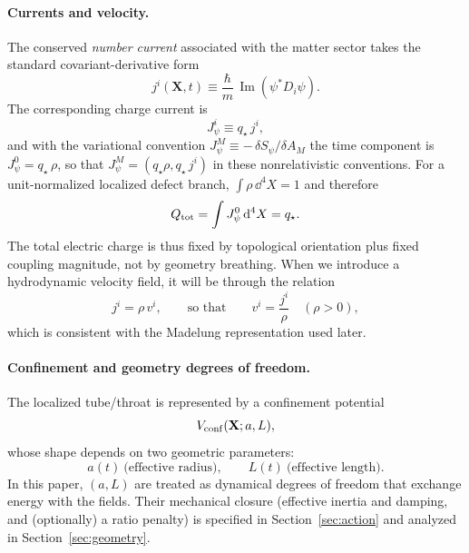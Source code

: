 \documentclass[11pt]{article}
\newcommand{\qstar}{q_\star}
\begin{document}
\paragraph{Currents and velocity.}
The conserved \emph{number current} associated with the matter sector takes the standard covariant-derivative form
\begin{equation}
j^i(\mathbf{X},t) \equiv \frac{\hbar}{m}\,\operatorname{Im}\!\left(\psi^* D_i\psi\right).
\end{equation}
The corresponding charge current is
\begin{equation}
J_{\psi}^i \equiv \qstar\,j^i,
\end{equation}
and with the variational convention $J_\psi^M\equiv -\,\delta S_\psi/\delta A_M$ the time component is $J_\psi^0=\qstar\,\rho$, so that $J_\psi^M=(\qstar\rho, \qstar\,j^i)$ in these nonrelativistic conventions. For a unit-normalized localized defect branch, $\int \rho\,\dd^4X=1$ and therefore
\begin{equation}
Q_{\rm tot}=\int J_\psi^0\,\dd^4X=\qstar.
\end{equation}
The total electric charge is thus fixed by topological orientation plus fixed coupling magnitude, not by geometry breathing. When we introduce a hydrodynamic velocity field, it will be through the relation
\begin{equation}
j^i = \rho\,v^i,
\qquad\text{so that}\qquad
v^i = \frac{j^i}{\rho}
\quad (\rho>0),
\end{equation}
which is consistent with the Madelung representation used later.

\paragraph{Confinement and geometry degrees of freedom.}
The localized tube/throat is represented by a confinement potential
\begin{equation}
V_{\rm conf}(\mathbf{X};a,L),
\end{equation}
whose shape depends on two geometric parameters:
\begin{equation}
a(t)\ \text{(effective radius)},\qquad
L(t)\ \text{(effective length)}.
\end{equation}
In this paper, $(a,L)$ are treated as dynamical degrees of freedom that exchange energy with the fields. Their mechanical closure (effective inertia and damping, and (optionally) a ratio penalty) is specified in Section~\ref{sec:action} and analyzed in Section~\ref{sec:geometry}.
\end{document}
